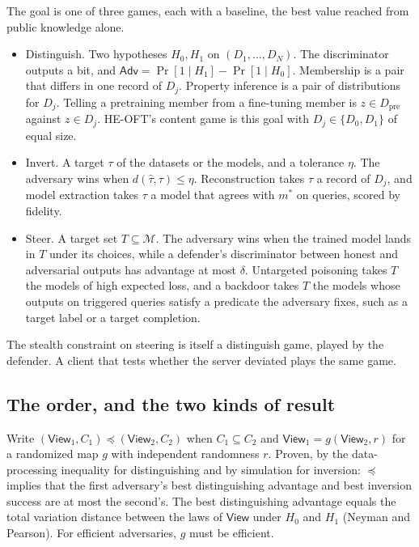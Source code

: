 \documentclass{labreport}
\newcommand{\Mc}{\mathcal{M}}
\newcommand{\View}{\mathsf{View}}
\newcommand{\Adv}{\mathsf{Adv}}
\newcommand{\Dpre}{D_{\mathrm{pre}}}
\begin{document}
The goal is one of three games, each with a baseline, the best value reached
from public knowledge alone.
\begin{itemize}
\item Distinguish. Two hypotheses $H_0, H_1$ on $(D_1,\dots,D_N)$. The
  discriminator outputs a bit, and
  $\Adv = \Pr[1 \mid H_1] - \Pr[1 \mid H_0]$. Membership is a pair that differs
  in one record of $D_j$. Property inference is a pair of distributions for
  $D_j$. Telling a pretraining member from a fine-tuning member is
  $z \in \Dpre$ against $z \in D_j$. HE-OFT's content game is this goal with
  $D_j \in \{D_0, D_1\}$ of equal size.
\item Invert. A target $\tau$ of the datasets or the models, and a tolerance
  $\eta$. The adversary wins when $d(\hat\tau, \tau) \le \eta$. Reconstruction
  takes $\tau$ a record of $D_j$, and model extraction takes $\tau$ a model that
  agrees with $m^{*}$ on queries, scored by fidelity.
\item Steer. A target set $T \subseteq \Mc$. The adversary wins when the trained
  model lands in $T$ under its choices, while a defender's discriminator between
  honest and adversarial outputs has advantage at most $\delta$. Untargeted
  poisoning takes $T$ the models of high expected loss, and a backdoor takes $T$
  the models whose outputs on triggered queries satisfy a predicate the
  adversary fixes, such as a target label or a target completion.
\end{itemize}
The stealth constraint on steering is itself a distinguish game, played by the
defender. A client that tests whether the server deviated plays the same game.

\subsection*{The order, and the two kinds of result}
Write $(\View_1,C_1) \preceq (\View_2,C_2)$ when $C_1 \subseteq C_2$ and
$\View_1 = g(\View_2, r)$ for a randomized map $g$ with independent randomness
$r$. Proven, by the data-processing inequality for distinguishing and by
simulation for inversion: $\preceq$ implies that the first adversary's best
distinguishing advantage and best inversion success are at most the second's.
The best distinguishing advantage equals the total variation distance between
the laws of $\View$ under $H_0$ and $H_1$ (Neyman and Pearson). For efficient
adversaries, $g$ must be efficient.
\end{document}
